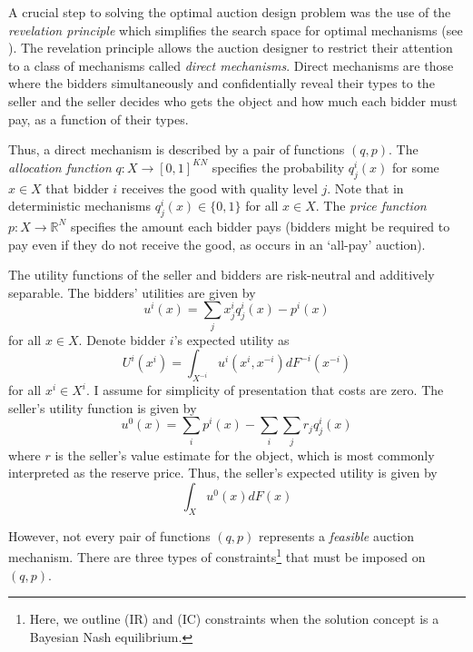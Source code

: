 A crucial step to solving the optimal auction design problem was the use of the \textit{revelation principle} which simplifies the search space for optimal mechanisms (see \cite[Lemma 1]{myerson1981optimal}). The revelation principle allows the auction designer to restrict their attention to a class of mechanisms called \textit{direct mechanisms}. Direct mechanisms are those where the bidders simultaneously and confidentially reveal their types to the seller and the seller decides who gets the object and how much each bidder must pay, as a function of their types.

Thus, a direct mechanism is described by a pair of functions $(q, p)$. The \textit{allocation function} $q:X\to[0,1]^{KN}$ specifies the probability $q_j^i(x)$ for some $x \in X$ that bidder $i$ receives the good with quality level $j$. Note that in deterministic mechanisms $q_j^i(x) \in \{0,1\}$ for all $x \in X$. The \textit{price function} $p:X\to\mathbb{R}^N$ specifies the amount each bidder pays (bidders might be required to pay even if they do not receive the good, as occurs in an `all-pay' auction).

The utility functions of the seller and bidders are risk-neutral and additively separable. The bidders' utilities are given by
\begin{equation}
    u^i(x) = \sum_j x_j^i q_j^i(x) - p^i(x)
\end{equation}
\noindent for all $x \in X$. Denote bidder $i$'s expected utility as
\begin{equation}\label{eq_expected_U}
    U^i(x^i) = \int_{X^{-i}} u^i(x^i,x^{-i}) dF^{-i}(x^{-i})
\end{equation}
\noindent for all $x^i \in X^i$. I assume for simplicity of presentation that costs are zero. The seller's utility function is given by
\begin{equation}
    u^0(x) = \sum_i p^i(x) - \sum_i \sum_j r_j q_j^i(x)  
\end{equation}
\noindent where $r$ is the seller's value estimate for the object, which is most commonly interpreted as the reserve price. Thus, the seller's expected utility is given by
\begin{equation}
    \int_X u^0(x) dF(x)
\end{equation}

However, not every pair of functions $(q,p)$ represents a \textit{feasible} auction mechanism. There are three types of constraints\footnote{Here, we outline (IR) and (IC) constraints when the solution concept is a Bayesian Nash equilibrium.} that must be imposed on $(q,p)$. 

